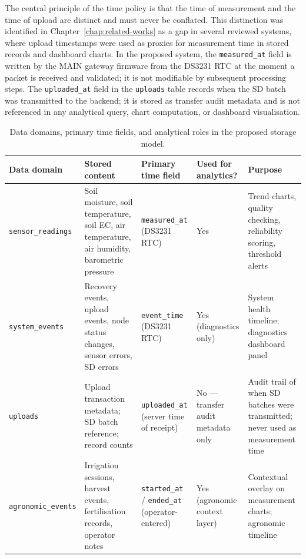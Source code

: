 The central principle of the time policy is that the time of measurement and the time of upload are distinct and must never be conflated. This distinction was identified in Chapter~\ref{chap:related-works} as a gap in several reviewed systems, where upload timestamps were used as proxies for measurement time in stored records and dashboard charts. In the proposed system, the \texttt{measured\_at} field is written by the MAIN gateway firmware from the DS3231 RTC at the moment a packet is received and validated; it is not modifiable by subsequent processing steps. The \texttt{uploaded\_at} field in the \texttt{uploads} table records when the SD batch was transmitted to the backend; it is stored as transfer audit metadata and is not referenced in any analytical query, chart computation, or dashboard visualisation.

\begin{table}[H]
\centering
\caption{Data domains, primary time fields, and analytical roles in the proposed storage model.}
\label{tab:data-domains-time-fields}
\small
\begin{tabular}{p{3.0cm} p{4.0cm} p{2.8cm} p{1.5cm} p{3.0cm}}
\hline
\textbf{Data domain} & \textbf{Stored content} & \textbf{Primary time field} & \textbf{Used for analytics?} & \textbf{Purpose} \\
\hline
\texttt{sensor\_readings} & Soil moisture, soil temperature, soil EC, air temperature, air humidity, barometric pressure & \texttt{measured\_at} (DS3231 RTC) & Yes & Trend charts, quality checking, reliability scoring, threshold alerts \\
\hline
\texttt{system\_events} & Recovery events, upload events, node status changes, sensor errors, SD errors & \texttt{event\_time} (DS3231 RTC) & Yes (diagnostics only) & System health timeline; diagnostics dashboard panel \\
\hline
\texttt{uploads} & Upload transaction metadata; SD batch reference; record counts & \texttt{uploaded\_at} (server time of receipt) & No — transfer audit metadata only & Audit trail of when SD batches were transmitted; never used as measurement time \\
\hline
\texttt{agronomic\_events} & Irrigation sessions, harvest events, fertilisation records, operator notes & \texttt{started\_at} / \texttt{ended\_at} (operator-entered) & Yes (agronomic context layer) & Contextual overlay on measurement charts; agronomic timeline \\
\hline
\end{tabular}
\end{table}

